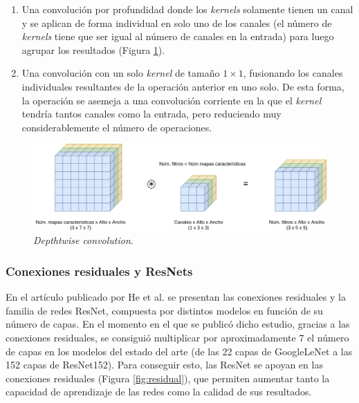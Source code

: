 \begin{itemize}
\begin{enumerate}
\item Una convolución por profundidad donde los \textit{kernels} solamente tienen un canal y se aplican de forma individual en solo uno de los canales (el número de \textit{kernels} tiene que ser igual al número de canales en la entrada) para luego agrupar los resultados (Figura \ref{fig:convolucion-depthwise}).
\item Una convolución con un solo \textit{kernel} de tamaño $1\times1$, fusionando los canales individuales resultantes de la operación anterior en uno solo. De esta forma, la operación se asemeja a una convolución corriente en la que el \textit{kernel} tendría tantos canales como la entrada, pero reduciendo muy considerablemente el número de operaciones.
\end{enumerate}

\begin{figure}[H]
\centering
\includegraphics[width=0.9\linewidth]{imagenes/convolucion-depthwise.png} 
\captionsetup{width=.9\linewidth}
\caption{\textit{Depthtwise convolution}.}
\label{fig:convolucion-depthwise}
\end{figure}

\end{itemize}

\subsubsection{Conexiones residuales y ResNets}

En el artículo publicado por He et al. \cite{resnet} se presentan las conexiones residuales y la familia de redes ResNet, compuesta por distintos modelos en función de su número de capas. En el momento en el que se publicó dicho estudio, gracias a las conexiones residuales, se consiguió multiplicar por aproximadamente $7$ el número de capas en los modelos del estado del arte (de las 22 capas de GoogleLeNet \cite{googlelenet} a las 152 capas de ResNet152). Para conseguir esto, las ResNet se apoyan en las conexiones residuales (Figura \ref{fig:residual}), que permiten aumentar tanto la capacidad de aprendizaje de las redes como la calidad de sus resultados.

